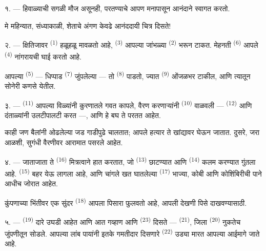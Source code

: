 \VUsaut{4.0mm}

१. --- हिवाळ्याची सगळी मौज असूनही,  परतण्याचे आपण मनापासून आनंदाने स्वागत
करतो.

मे महिन्यात, संध्याकाळी, शेताचे अंगण केवढे आनंददायी चित्र दिसते!

२. --- क्षितिजावर  \textsuperscript{(1)} हळूहळू मावळतो आहे, 
\textsuperscript{(3)} आपल्या जांभळ्या  \textsuperscript{(2)} भरून टाकत.
मेहनती  \textsuperscript{(6)} आपले  \textsuperscript{(4)}
नांगरायची घाई करतो आहे.

आपल्या  \textsuperscript{(5)} — धिप्पाड 
\textsuperscript{(7)} जुंपलेल्या — तो  \textsuperscript{(8)} पाडतो, ज्यात
 \textsuperscript{(9)} ओंजळभर  टाकील, आणि त्यातून सोनेरी कणसे
येतील.

३. ---  \textsuperscript{(11)} आपल्या विळ्यांनी कुरणातले गवत कापले,
वैरण करणाऱ्यांनी  \textsuperscript{(10)} वाळवली — 
\textsuperscript{(12)} आणि दंताळ्यांनी उलटीपालटी करत —, आणि हे बघ ते परतत आहेत.

काही जण बैलांनी ओढलेल्या जड गाडीपुढे चालतात; आपले हत्यार ते खांद्यावर घेऊन जातात. दुसरे, जरा
आळशी, सुगंधी वैरणीवर आरामात पसरले आहेत.

४. --- जाताजाता ते  \textsuperscript{(16)} मित्रत्वाने हात करतात, जो
 \textsuperscript{(13)}  छाटण्यात आणि
 \textsuperscript{(14)} कलम करण्यात गुंतला आहे.
 \textsuperscript{(15)} बहर येऊ लागला आहे, आणि चांगले खत
घातलेल्या  \textsuperscript{(17)} भाज्या, कोबी आणि कोशिंबिरीची पाने
आधीच जोरात आहेत.

कुंपणाच्या भिंतीवर एक सुंदर  \textsuperscript{(18)} आपला पिसारा फुलवतो आहे, आपली
देखणी पिसे दाखवण्यासाठी.

\VUsaut{3.0mm}

५. ---  \textsuperscript{(19)} दारे उघडी आहेत आणि आत गव्हाण आणि
 \textsuperscript{(23)} दिसते — 
\textsuperscript{(21)}, जिला  \textsuperscript{(20)} नुकतेच जुंपणीतून
सोडले. आपल्या लांब पायांनी इतके गमतीदार दिसणारे  \textsuperscript{(22)} उड्या
मारत आपल्या आईमागे जाते आहे.

